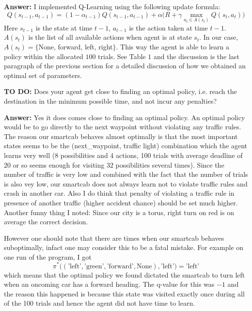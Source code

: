 \documentclass{article}
\begin{document}
\noindent\textbf{Answer:} I implemented Q-Learning using the following update formula: 
$$Q(s_{t-1},a_{t-1})=(1-\alpha_{t-1})Q(s_{t-1},a_{t-1})+\alpha\big(R+\gamma\max_{a_{t}\in A(s_{t})}Q(s_{t},a_{t})\big)$$
 Here $s_{t-1}$ is the state at time $t-1$, $a_{t-1}$ is the action taken at time $t-1$. $A(s_t)$  is the list of all available actions when agent is at state $s_t$. In our case, $A(s_t)=\{$None, forward, left, right$\}$. This way the agent is able to learn a policy within the allocated $100$ trials. See Table $1$ and the discussion is the last paragraph of the previous section for a detailed discussion of how we obtained an optimal set of parameters.

\vspace{.5cm}

\noindent\textbf{TO DO:} Does your agent get close to finding an optimal policy, i.e. reach the destination in the minimum possible time, and not incur any penalties?

\vspace{.2cm}

\noindent\textbf{Answer:} Yes it does comes close to finding an optimal policy. An optimal policy would be to go directly to the next waypoint without violating any traffic rules. The reason our smartcab behaves almost optimally is that the most important states seems to be the (next\_waypoint, traffic light) combination which the agent learns very well (8 possibilities and 4 actions, 100 trials with average deadline of 20 or so seems enough for visiting 32 possibilities several times). Since the number of traffic is very low and combined with the fact that the number of trials is also vey low, our smartcab does not always learn not to violate traffic rules and crash in another car. Also I do think that penalty of violating a traffic rule in presence of another traffic (higher accident chance) should be set much higher. Another funny thing I noted: Since our city is a torus, right turn on red is on average the correct decision.

However one should note that there are times when our smartcab behaves suboptimally, infact one may consider this to be a fatal mistake. For example on one run of the program, I got $$\pi^*\big((\text{'left'},\text{'green'}, \text{'forward'}, \text{None}), \text{'left'}\big)=\text{'left'}$$  
which means that the optimal policy we found dictated the smartcab to turn left when an oncoming car has a forward heading. The q-value for this was $-1$ and the reason this happened is because this state was visited exactly once during all of the 100 trials and hence the agent did not have time to learn.
\end{document}

